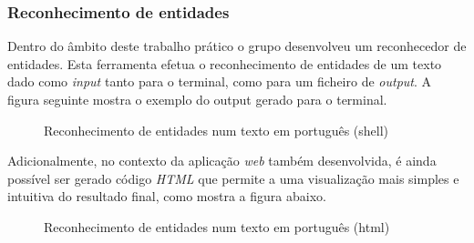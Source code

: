 \documentclass[12pt]{article}
\begin{document}
\subsubsection{Reconhecimento de entidades}

Dentro do âmbito deste trabalho prático o grupo desenvolveu um reconhecedor de entidades. Esta ferramenta efetua o reconhecimento de entidades de um texto dado como \textit{input}
tanto para o terminal, como para um ficheiro de \textit{output}. A figura seguinte mostra o exemplo do output gerado para o terminal.

\begin{figure}[!ht]
	\centering
	\caption{Reconhecimento de entidades num texto em português (shell)}
\end{figure}

\newpage
Adicionalmente, no contexto da aplicação \textit{web} também desenvolvida, é ainda possível ser gerado código \textit{HTML} que permite a uma visualização mais simples e intuitiva do
resultado final, como mostra a figura abaixo.

\begin{figure}[!ht]
	\centering
	\caption{Reconhecimento de entidades num texto em português (html)}
\end{figure}
\end{document}
